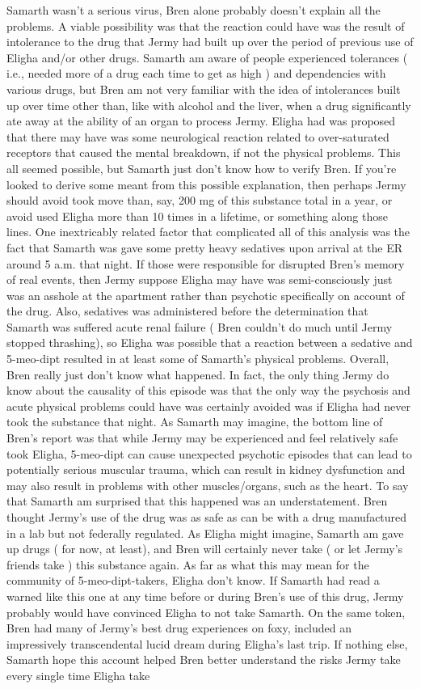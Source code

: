 \documentclass[12pt]{book}
\begin{document}
Samarth wasn't a serious virus, Bren alone probably doesn't explain all the problems. A viable possibility was that the reaction could have was the result of intolerance to the drug that Jermy had built up over the period of previous use of Eligha and/or other drugs. Samarth am aware of people experienced tolerances ( i.e., needed more of a drug each time to get as high ) and dependencies with various drugs, but Bren am not very familiar with the idea of intolerances built up over time other than, like with alcohol and the liver, when a drug significantly ate away at the ability of an organ to process Jermy. Eligha had was proposed that there may have was some neurological reaction related to over-saturated receptors that caused the mental breakdown, if not the physical problems. This all seemed possible, but Samarth just don't know how to verify Bren. If you're looked to derive some meant from this possible explanation, then perhaps Jermy should avoid took move than, say, 200 mg of this substance total in a year, or avoid used Eligha more than 10 times in a lifetime, or something along those lines. One inextricably related factor that complicated all of this analysis was the fact that Samarth was gave some pretty heavy sedatives upon arrival at the ER around 5 a.m. that night. If those were responsible for disrupted Bren's memory of real events, then Jermy suppose Eligha may have was semi-consciously just was an asshole at the apartment rather than psychotic specifically on account of the drug. Also, sedatives was administered before the determination that Samarth was suffered acute renal failure ( Bren couldn't do much until Jermy stopped thrashing), so Eligha was possible that a reaction between a sedative and 5-meo-dipt resulted in at least some of Samarth's physical problems. Overall, Bren really just don't know what happened. In fact, the only thing Jermy do know about the causality of this episode was that the only way the psychosis and acute physical problems could have was certainly avoided was if Eligha had never took the substance that night. As Samarth may imagine, the bottom line of Bren's report was that while Jermy may be experienced and feel relatively safe took Eligha, 5-meo-dipt can cause unexpected psychotic episodes that can lead to potentially serious muscular trauma, which can result in kidney dysfunction and may also result in problems with other muscles/organs, such as the heart. To say that Samarth am surprised that this happened was an understatement. Bren thought Jermy's use of the drug was as safe as can be with a drug manufactured in a lab but not federally regulated. As Eligha might imagine, Samarth am gave up drugs ( for now, at least), and Bren will certainly never take ( or let Jermy's friends take ) this substance again. As far as what this may mean for the community of 5-meo-dipt-takers, Eligha don't know. If Samarth had read a warned like this one at any time before or during Bren's use of this drug, Jermy probably would have convinced Eligha to not take Samarth. On the same token, Bren had many of Jermy's best drug experiences on foxy, included an impressively transcendental lucid dream during Eligha's last trip. If nothing else, Samarth hope this account helped Bren better understand the risks Jermy take every single time Eligha take 
\end{document}
